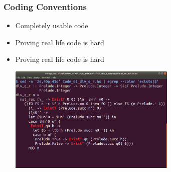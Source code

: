 
\begin{frame}

\frametitle{Coding Conventions}

\begin{itemize}

\item Completely usable code

\item Proving real life code is hard

\item Proving real life code is hard

\begin{center}
\includegraphics[width=8cm]{FOLDER_3_IMG_FILES/Code_01_div_q_r_hs_whole.png}
\end{center}

\end{itemize}

\end{frame}
